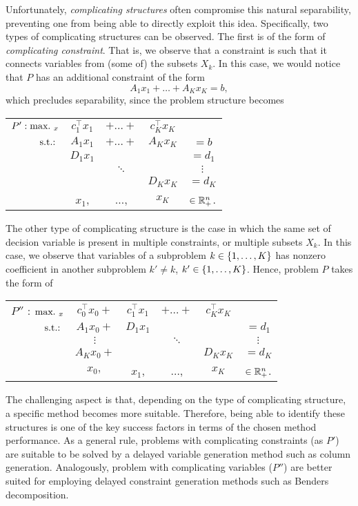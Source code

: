 Unfortunately, \emph{complicating structures} often compromise this natural separability, preventing one from being able to directly exploit this idea. Specifically, two types of complicating structures can be observed. The first is of the form of \emph{complicating constraint}. That is, we observe that a constraint is such that it connects variables from (some of) the subsets $X_k$. In this case, we would notice that $P$ has an additional constraint of the form
%
\begin{equation*}
	A_1x_1 + \dots + A_Kx_K = b,
\end{equation*}
%
which precludes separability, since the problem structure becomes
% 
\begin{center}
	\begin{tabular}{rcccc}
	    $P':  \mathop{\text{max.~}}_x$ & $c_1^\top x_1$ & $+\dots+$ & $c_K^\top x_K$ & \\
	            $\mathop{\text{s.t.:~}}$  & $A_1x_1$ & $+\dots+$ & $A_Kx_K$ & $=b$ \\
	                   & $D_1x_1$ &           &          & $= d_1$ \\
	                   &          & $\ddots$  &          & $\vdots$ \\
	                   &          &           & $D_Kx_K$ & $= d_K$ \\
	                   &  $x_1$,  & $\dots$,  & $x_K$ & $\in \mathbb{R}^n_+$. 
	\end{tabular}
\end{center}

The other type of complicating structure is the case in which the same set of decision variable is present in multiple constraints, or multiple subsets $X_k$. In this case, we observe that variables of a subproblem $k \in \left\{ 1,\dots,K \right \}$ has nonzero coefficient in another subproblem $k' \neq k$, $k' \in \left\{ 1,\dots,K \right \}$. Hence, problem $P$ takes the form of
%
\begin{center}
	\begin{tabular}{rccccc}
	$P''$ : $\mathop{\text{max.~}}_x$ & $c_0^\top x_0 +$ &  $c_1^\top x_1$ & $+\dots+$ & $c_K^\top x_K$ & \\
        $\mathop{\text{s.t.:~}}$  & $A_1x_0+$ & $D_1x_1$ &           &          & $= d_1$ \\
               & $\vdots$  &          & $\ddots$  &          & $\vdots$ \\
               & $A_Kx_0+$ &          &           & $D_Kx_K$ & $= d_K$ \\
               & $x_0,$    &  $x_1$,  & $\dots$,  & $x_K$    & $\in \mathbb{R}^n_+$. 
	\end{tabular}
\end{center}
%
The challenging aspect is that, depending on the type of complicating structure, a specific method becomes more suitable. Therefore, being able to identify these structures is one of the key success factors in terms of the chosen method performance. As a general rule, problems with complicating constraints (as $P'$) are suitable to be solved by a delayed variable generation method such as column generation. Analogously, problem with complicating variables ($P''$) are better suited for employing delayed constraint generation methods such as Benders decomposition. 

